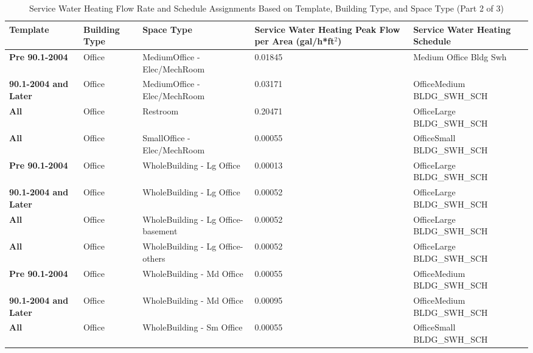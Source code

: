 \begin{table}
\centering
\small
\caption[Service Water Heating Flow Rate and Schedules Part 2]{Service Water Heating Flow Rate and Schedule Assignments Based on Template, Building Type, and Space Type (Part 2 of 3)}
\label{tab:swh_flow_rates_p2}
\begin{tabular}{|p{3cm}|p{3cm}|p{3cm}|p{3cm}|p{3cm}|}
\hline
\textbf{Template} &
  \textbf{Building Type} &
  \textbf{Space Type} &
  \textbf{Service Water   Heating Peak Flow per Area (gal/h*ft$^2$)} &
  \textbf{Service Water   Heating Schedule} \\ \hline
\textbf{Pre 90.1-2004}  & Office          & MediumOffice -   Elec/MechRoom       & 0.01845 & Medium Office Bldg   Swh           \\ \hline
\textbf{90.1-2004 and Later} & Office          & MediumOffice -   Elec/MechRoom       & 0.03171 & OfficeMedium   BLDG\_SWH\_SCH      \\ \hline
\textbf{All}                     & Office          & Restroom                             & 0.20471 & OfficeLarge   BLDG\_SWH\_SCH       \\ \hline
\textbf{All}                     & Office          & SmallOffice -   Elec/MechRoom        & 0.00055 & OfficeSmall   BLDG\_SWH\_SCH       \\ \hline
\textbf{Pre 90.1-2004}  & Office          & WholeBuilding - Lg   Office          & 0.00013 & OfficeLarge   BLDG\_SWH\_SCH       \\ \hline
\textbf{90.1-2004 and Later} & Office          & WholeBuilding - Lg   Office          & 0.00052 & OfficeLarge   BLDG\_SWH\_SCH       \\ \hline
\textbf{All}                     & Office          & WholeBuilding - Lg   Office-basement & 0.00052 & OfficeLarge   BLDG\_SWH\_SCH       \\ \hline
\textbf{All}                     & Office          & WholeBuilding - Lg   Office-others   & 0.00052 & OfficeLarge   BLDG\_SWH\_SCH       \\ \hline
\textbf{Pre 90.1-2004}  & Office          & WholeBuilding - Md   Office          & 0.00055 & OfficeMedium   BLDG\_SWH\_SCH      \\ \hline
\textbf{90.1-2004 and Later} & Office          & WholeBuilding - Md   Office          & 0.00095 & OfficeMedium   BLDG\_SWH\_SCH      \\ \hline
\textbf{All}                     & Office          & WholeBuilding - Sm   Office          & 0.00055 & OfficeSmall   BLDG\_SWH\_SCH       \\ \hline

\end{tabular}
\end{table}
